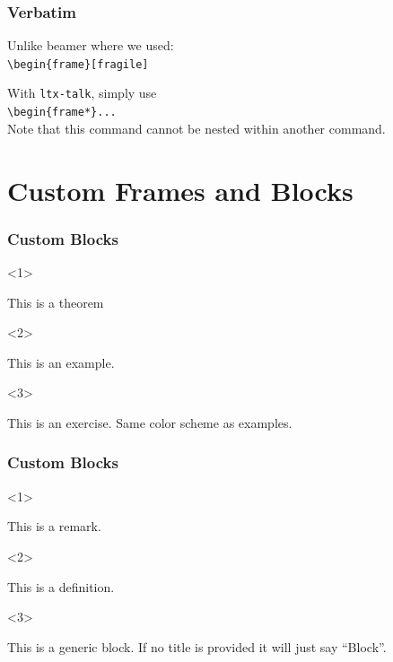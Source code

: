 \documentclass{ltx-talk}
\begin{document}
	\begin{frame*}
		\frametitle{Verbatim}
		Unlike beamer where we used:\\
		\verb|\begin{frame}[fragile]|
			
		\vspace{0.5cm}
		With \verb|ltx-talk|, simply use\\
		\verb|\begin{frame*}...|\\
		Note that this command cannot be nested within another command.
	\end{frame*}
	
\section{Custom Frames and Blocks}
	\begin{frame}
		\frametitle{Custom Blocks}
		\begin{uncoverenv}<1>
		\begin{theory}
			This is a theorem
		\end{theory}
		\end{uncoverenv}
		
		\begin{uncoverenv}<2>
		\begin{example}
			This is an example.
		\end{example}
		\end{uncoverenv}
		
		\begin{uncoverenv}<3>
		\begin{exercise}
			This is an exercise. Same color scheme as examples.
		\end{exercise}
		\end{uncoverenv}
	\end{frame}
	
	\begin{frame}
		\frametitle{Custom Blocks}
		\begin{uncoverenv}<1>
			\begin{remark}
				This is a remark.
			\end{remark}
		\end{uncoverenv}
		
		\begin{uncoverenv}<2>
			\begin{definition}
				This is a definition.
			\end{definition}
		\end{uncoverenv}
		
		\begin{uncoverenv}<3>
			\begin{adablock}
				This is a generic block. If no title is provided it will just say ``Block''.
			\end{adablock}
		\end{uncoverenv}
	\end{frame}
	
\end{document}
